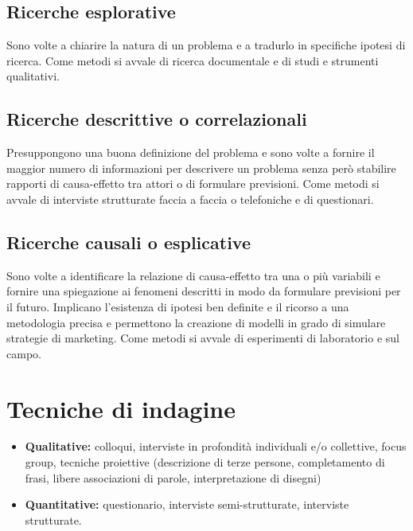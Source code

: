 \subsection{Ricerche esplorative}
Sono volte a chiarire la natura di un problema e a tradurlo in specifiche ipotesi di ricerca. Come metodi si avvale di ricerca documentale e di studi e strumenti qualitativi.

\subsection{Ricerche descrittive o correlazionali}
Presuppongono una buona definizione del problema e sono volte a fornire il maggior numero di informazioni per descrivere un problema senza però stabilire rapporti di causa-effetto tra attori o di formulare previsioni. \newline
Come metodi si avvale di interviste strutturate faccia a faccia o telefoniche e di questionari.

\subsection{Ricerche causali o esplicative}
Sono volte a identificare la relazione di causa-effetto tra una o più variabili e fornire una spiegazione ai fenomeni descritti in modo da formulare previsioni per il futuro. Implicano l’esistenza di ipotesi ben definite e il ricorso a una metodologia precisa e permettono la creazione di modelli in grado di simulare strategie di marketing. Come metodi si avvale di esperimenti di laboratorio e sul campo.

\section{Tecniche di indagine}
\begin{itemize}
	\item \textbf{Qualitative:} colloqui, interviste in profondità individuali e/o collettive, focus group, tecniche proiettive (descrizione di terze persone, completamento di frasi, libere associazioni di parole, interpretazione di disegni)
	\item \textbf{Quantitative:} questionario, interviste semi-strutturate, interviste strutturate.
\end{itemize}


